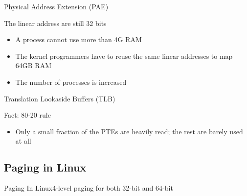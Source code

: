 \begin{frame}{Physical Address Extension (PAE)}
  \begin{block}{The linear address are still 32 bits}
    \begin{itemize}
    \item A process cannot use more than 4G RAM
    \item The kernel programmers have to reuse the same linear addresses to map 64GB RAM
    \item The number of processes is increased
    \end{itemize}
  \end{block}
\end{frame}

\begin{frame}{Translation Lookaside Buffers (TLB)}
    \begin{block}{Fact: 80-20 rule}
    \begin{itemize}
    \item Only a small fraction of the PTEs are heavily read; the rest are barely used at
      all
    \end{itemize}
  \end{block}
  \begin{center}
  \end{center}
\end{frame}

\subsection{Paging in Linux}

\begin{frame}{Paging In Linux}{4-level paging for both 32-bit and 64-bit}
  \begin{center}
  \end{center}
\end{frame}

